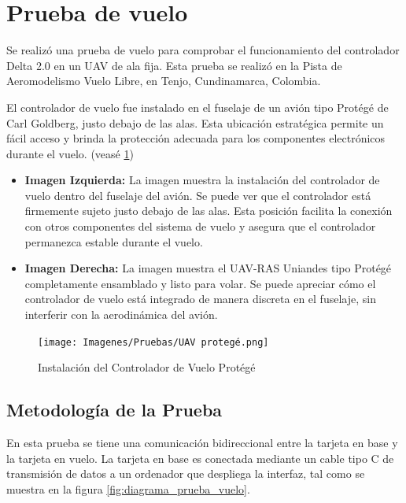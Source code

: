 
\section{Prueba de vuelo}

    Se realizó una prueba de vuelo para comprobar el funcionamiento del controlador Delta 2.0 en un UAV de ala fija. Esta prueba se realizó en la Pista de Aeromodelismo Vuelo Libre, en Tenjo, Cundinamarca, Colombia. 

    El controlador de vuelo fue instalado en el fuselaje de un avión tipo Protégé de Carl Goldberg, justo debajo de las alas. Esta ubicación estratégica permite un fácil acceso y brinda la protección adecuada para los componentes electrónicos durante el vuelo. (veasé \ref{fig:protege})

    \begin{itemize}
        \item \textbf{Imagen Izquierda:} La imagen muestra la instalación del controlador de vuelo dentro del fuselaje del avión. Se puede ver que el controlador está firmemente sujeto justo debajo de las alas. Esta posición facilita la conexión con otros componentes del sistema de vuelo y asegura que el controlador permanezca estable durante el vuelo.
        
        \item \textbf{Imagen Derecha:} La imagen muestra el UAV-RAS Uniandes tipo Protégé completamente ensamblado y listo para volar. Se puede apreciar cómo el controlador de vuelo está integrado de manera discreta en el fuselaje, sin interferir con la aerodinámica del avión.
    \end{itemize}


    \begin{figure}[H]
        \centering
        \texttt{[image: Imagenes/Pruebas/UAV protegé.png]}
        \caption{Instalación del Controlador de Vuelo Protégé}
        \label{fig:protege}
    \end{figure}


    \subsection{Metodología de la Prueba}

        En esta prueba se tiene una comunicación bidireccional entre la tarjeta en base y la tarjeta en vuelo. La tarjeta en base es conectada mediante un cable tipo C de transmisión de datos a un ordenador que despliega la interfaz, tal como se muestra en la figura \ref{fig:diagrama_prueba_vuelo}.

